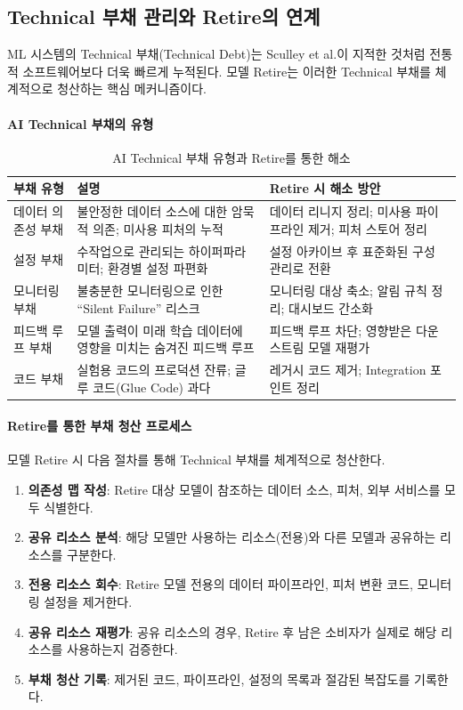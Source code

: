 \subsection{Technical 부채 관리와 Retire의 연계}
\label{sec:12.4.3}

ML 시스템의 Technical 부채(Technical Debt)는 Sculley et al.\cite{sculley2015hidden}이 지적한 것처럼 전통적 소프트웨어보다 더욱 빠르게 누적된다. 모델 Retire는 이러한 Technical 부채를 체계적으로 청산하는 핵심 메커니즘이다.

\paragraph{AI Technical 부채의 유형}

\begin{table}[htbp]
\centering
\caption{AI Technical 부채 유형과 Retire를 통한 해소}
\label{tab:tech_debt_types}
\begin{tabularx}{\textwidth}{p{2.5cm}p{4cm}X}
\toprule
\textbf{부채 유형} & \textbf{설명} & \textbf{Retire 시 해소 방안} \\
\midrule
데이터 의존성 부채 &
불안정한 데이터 소스에 대한 암묵적 의존; 미사용 피처의 누적 &
데이터 리니지 정리; 미사용 파이프라인 제거; 피처 스토어 정리 \\
\midrule
설정 부채 &
수작업으로 관리되는 하이퍼파라미터; 환경별 설정 파편화 &
설정 아카이브 후 표준화된 구성 관리로 전환 \\
\midrule
모니터링 부채 &
불충분한 모니터링으로 인한 ``Silent Failure'' 리스크 &
모니터링 대상 축소; 알림 규칙 정리; 대시보드 간소화 \\
\midrule
피드백 루프 부채 &
모델 출력이 미래 학습 데이터에 영향을 미치는 숨겨진 피드백 루프 &
피드백 루프 차단; 영향받은 다운스트림 모델 재평가 \\
\midrule
코드 부채 &
실험용 코드의 프로덕션 잔류; 글루 코드(Glue Code) 과다 &
레거시 코드 제거; Integration 포인트 정리 \\
\bottomrule
\end{tabularx}
\end{table}

\paragraph{Retire를 통한 부채 청산 프로세스}
모델 Retire 시 다음 절차를 통해 Technical 부채를 체계적으로 청산한다.

\begin{enumerate}
 \item \textbf{의존성 맵 작성}: Retire 대상 모델이 참조하는 데이터 소스, 피처, 외부 서비스를 모두 식별한다.
 \item \textbf{공유 리소스 분석}: 해당 모델만 사용하는 리소스(전용)와 다른 모델과 공유하는 리소스를 구분한다.
 \item \textbf{전용 리소스 회수}: Retire 모델 전용의 데이터 파이프라인, 피처 변환 코드, 모니터링 설정을 제거한다.
 \item \textbf{공유 리소스 재평가}: 공유 리소스의 경우, Retire 후 남은 소비자가 실제로 해당 리소스를 사용하는지 검증한다.
 \item \textbf{부채 청산 기록}: 제거된 코드, 파이프라인, 설정의 목록과 절감된 복잡도를 기록한다.
\end{enumerate}


